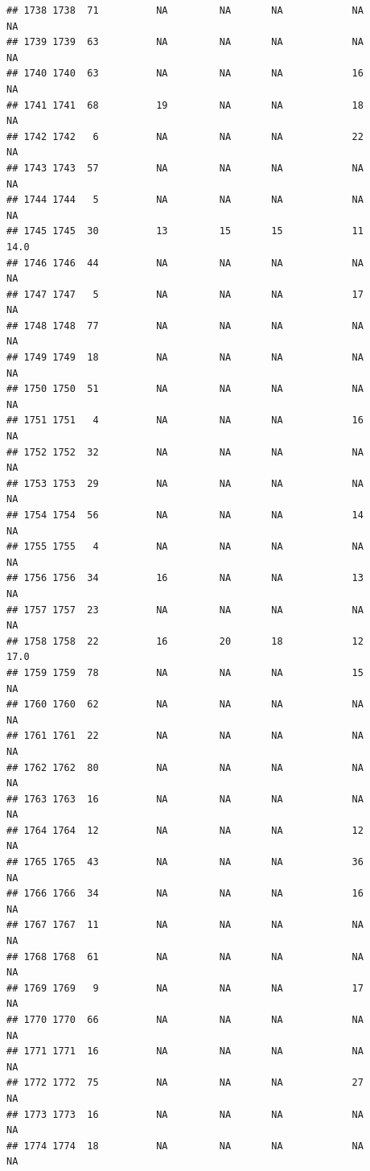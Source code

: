 \documentclass[man]{apa6}
\begin{document}
\begin{verbatim}
## 1738 1738  71          NA         NA       NA            NA       NA
## 1739 1739  63          NA         NA       NA            NA       NA
## 1740 1740  63          NA         NA       NA            16       NA
## 1741 1741  68          19         NA       NA            18       NA
## 1742 1742   6          NA         NA       NA            22       NA
## 1743 1743  57          NA         NA       NA            NA       NA
## 1744 1744   5          NA         NA       NA            NA       NA
## 1745 1745  30          13         15       15            11     14.0
## 1746 1746  44          NA         NA       NA            NA       NA
## 1747 1747   5          NA         NA       NA            17       NA
## 1748 1748  77          NA         NA       NA            NA       NA
## 1749 1749  18          NA         NA       NA            NA       NA
## 1750 1750  51          NA         NA       NA            NA       NA
## 1751 1751   4          NA         NA       NA            16       NA
## 1752 1752  32          NA         NA       NA            NA       NA
## 1753 1753  29          NA         NA       NA            NA       NA
## 1754 1754  56          NA         NA       NA            14       NA
## 1755 1755   4          NA         NA       NA            NA       NA
## 1756 1756  34          16         NA       NA            13       NA
## 1757 1757  23          NA         NA       NA            NA       NA
## 1758 1758  22          16         20       18            12     17.0
## 1759 1759  78          NA         NA       NA            15       NA
## 1760 1760  62          NA         NA       NA            NA       NA
## 1761 1761  22          NA         NA       NA            NA       NA
## 1762 1762  80          NA         NA       NA            NA       NA
## 1763 1763  16          NA         NA       NA            NA       NA
## 1764 1764  12          NA         NA       NA            12       NA
## 1765 1765  43          NA         NA       NA            36       NA
## 1766 1766  34          NA         NA       NA            16       NA
## 1767 1767  11          NA         NA       NA            NA       NA
## 1768 1768  61          NA         NA       NA            NA       NA
## 1769 1769   9          NA         NA       NA            17       NA
## 1770 1770  66          NA         NA       NA            NA       NA
## 1771 1771  16          NA         NA       NA            NA       NA
## 1772 1772  75          NA         NA       NA            27       NA
## 1773 1773  16          NA         NA       NA            NA       NA
## 1774 1774  18          NA         NA       NA            NA       NA

\end{verbatim}
\end{document}
